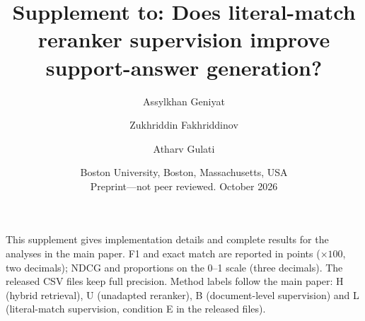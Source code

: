 \documentclass[11pt,a4paper]{article}
\title{Supplement to: Does literal-match reranker supervision improve support-answer generation?}
\author{Assylkhan Geniyat \and Zukhriddin Fakhriddinov \and Atharv Gulati}\date{Boston University, Boston, Massachusetts, USA\\Preprint---not peer reviewed. October 2026}
\begin{document}
\maketitle
\noindent This supplement gives implementation details and complete results for the analyses in the main paper. F1 and exact match are reported in points ($\times100$, two decimals); NDCG and proportions on the 0--1 scale (three decimals). The released CSV files keep full precision. Method labels follow the main paper: H (hybrid retrieval), U (unadapted reranker), B (document-level supervision) and L (literal-match supervision, condition E in the released files).

\setcounter{tocdepth}{1}\tableofcontents
\clearpage



\end{document}
